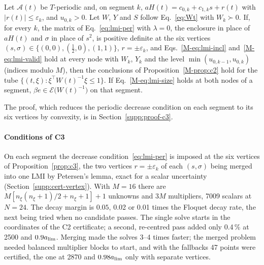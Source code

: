 \begin{proposition}\label{prop:c3}
Let $\mathcal A(t)$ be $T$-periodic and, on segment $k$, $aH(t)=c_{0,k}+c_{1,k}s+r(t)$ with $\lvert r(t)\rvert\le\varepsilon_k$, and $u_{0,k}>0$. Let $W$, $Y$ and $S$ follow Eq.~\eqref{eq:Wt} with $W_k\succ0$. If, for every $k$, the matrix of Eq.~\eqref{eq:lmi-per} with $\lambda=0$, the enclosure in place of $aH(t)$ and $\sigma$ in place of $s^2$, is positive definite at the six vertices $(s,\sigma)\in\{(0,0),(\tfrac12,0),(1,1)\}$, $r=\pm\varepsilon_k$, and Eqs.~\eqref{M-eq:lmi-incl} and~\eqref{M-eq:lmi-valid} hold at every node with $W_k$, $Y_k$ and the level $\min(u_{0,k-1},u_{0,k})$ (indices modulo $M$), then the conclusions of Proposition~\ref{M-prop:c2} hold for the tube $\{(t,\xi):\xi^\top W(t)^{-1}\xi\le1\}$. If Eq.~\eqref{M-eq:lmi-size} holds at both nodes of a segment, $\beta e\in\mathcal E\big(W(t)^{-1}\big)$ on that segment.
\end{proposition}
The proof, which reduces the periodic decrease condition on each segment to its six vertices by convexity, is in Section~\ref{supp:proof-c3}.

\paragraph{Conditions of C3}
On each segment the decrease condition~\eqref{eq:lmi-per} is imposed at the six vertices of Proposition~\ref{prop:c3}, the two vertices $r=\pm\varepsilon_k$ of each $(s,\sigma)$ being merged into one LMI by Petersen's lemma, exact for a scalar uncertainty \citep{petersen1987stabilization} (Section~\ref{supp:cert-vertex}). With $M=16$ there are $M[n_\xi(n_\xi+1)/2+n_\xi+1]+1$ unknowns and $3M$ multipliers, 7009 scalars at $N=24$. The decay margin is $0.05$, 0.02 or 0.01 times the Floquet decay rate, the next being tried when no candidate passes. The single solve starts in the coordinates of the C2 certificate; a second, re-centred pass added only 0.4\,\% at \SI{2500}{\rpm} and $0.9a_{\lim}$. Merging made the solves 3--4 times faster; the merged problem needed balanced multiplier blocks to start, and with the fallbacks 47 points were certified, the one at \SI{2870}{\rpm} and $0.98a_{\lim}$ only with separate vertices.

